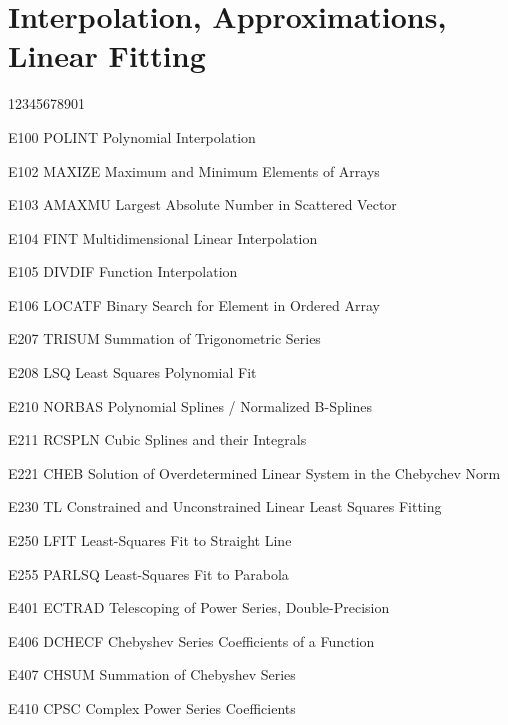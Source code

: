 \section*{Interpolation, Approximations, Linear Fitting}
\begin{DLtt}{12345678901}
\item[E100 POLINT] Polynomial Interpolation
\item[E102 MAXIZE] Maximum and Minimum Elements of Arrays
\item[E103 AMAXMU] Largest Absolute Number in Scattered Vector
\item[E104 FINT] Multidimensional Linear Interpolation
\item[E105 DIVDIF] Function Interpolation
\item[E106 LOCATF] Binary Search for Element in Ordered Array
\item[E207 TRISUM] Summation of Trigonometric Series
\item[E208 LSQ] Least Squares Polynomial Fit
\item[E210 NORBAS] Polynomial Splines / Normalized B-Splines
\item[E211 RCSPLN] Cubic Splines and their Integrals
\item[E221 CHEB] Solution of Overdetermined Linear System in the Chebychev Norm
\item[E230 TL] Constrained and Unconstrained Linear Least Squares Fitting
\item[E250 LFIT] Least-Squares Fit to Straight Line
\item[E255 PARLSQ] Least-Squares Fit to Parabola
\item[E401 ECTRAD] Telescoping of Power Series, Double-Precision
\item[E406 DCHECF] Chebyshev Series Coefficients of a Function
\item[E407 CHSUM] Summation of Chebyshev Series
\item[E410 CPSC] Complex Power Series Coefficients
\end{DLtt}
